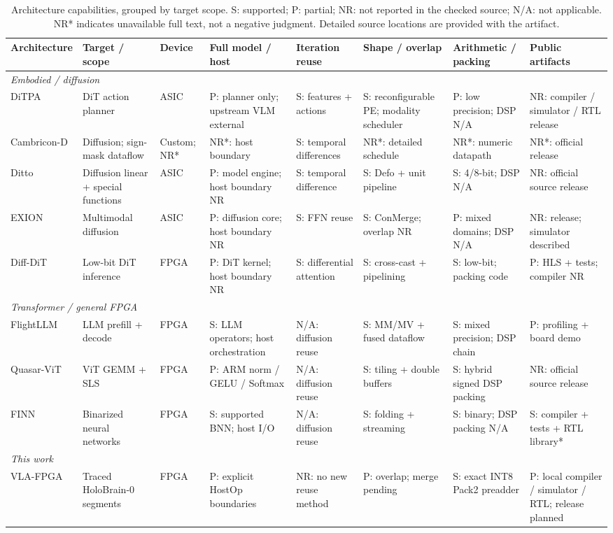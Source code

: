 \begin{table}[t]\centering
\caption{Architecture capabilities, grouped by target scope. S: supported; P: partial; NR: not reported in the checked source; N/A: not applicable. NR* indicates unavailable full text, not a negative judgment. Detailed source locations are provided with the artifact.}\label{tab:related}
\fontsize{7}{8.5}\selectfont\setlength{\tabcolsep}{2pt}\renewcommand{\arraystretch}{1.22}
\begin{tabularx}{\textwidth}{@{}p{}p{}p{}XXXX X@{}}\toprule
Architecture & Target / scope & Device & Full model / host & Iteration reuse & Shape / overlap & Arithmetic / packing & Public artifacts\\\midrule
\multicolumn{8}{l}{\textit{Embodied / diffusion}}\\
DiTPA~\cite{ditpa} & DiT action planner & ASIC & P: planner only; upstream VLM external & S: features + actions & S: reconfigurable PE; modality scheduler & P: low precision; DSP N/A & NR: compiler / simulator / RTL release\\
Cambricon-D~\cite{camd} & Diffusion; sign-mask dataflow & Custom; NR* & NR*: host boundary & S: temporal differences & NR*: detailed schedule & NR*: numeric datapath & NR*: official release\\
Ditto~\cite{ditto} & Diffusion linear + special functions & ASIC & P: model engine; host boundary NR & S: temporal difference & S: Defo + unit pipeline & S: 4/8-bit; DSP N/A & NR: official source release\\
EXION~\cite{exion} & Multimodal diffusion & ASIC & P: diffusion core; host boundary NR & S: FFN reuse & S: ConMerge; overlap NR & P: mixed domains; DSP N/A & NR: release; simulator described\\
Diff-DiT~\cite{diffdit} & Low-bit DiT inference & FPGA & P: DiT kernel; host boundary NR & S: differential attention & S: cross-cast + pipelining & S: low-bit; packing code & P: HLS + tests; compiler NR\\
\multicolumn{8}{l}{\textit{Transformer / general FPGA}}\\
FlightLLM~\cite{flight} & LLM prefill + decode & FPGA & S: LLM operators; host orchestration & N/A: diffusion reuse & S: MM/MV + fused dataflow & S: mixed precision; DSP chain & P: profiling + board demo\\
Quasar-ViT~\cite{quasar} & ViT GEMM + SLS & FPGA & P: ARM norm / GELU / Softmax & N/A: diffusion reuse & S: tiling + double buffers & S: hybrid signed DSP packing & NR: official source release\\
FINN~\cite{finn} & Binarized neural networks & FPGA & S: supported BNN; host I/O & N/A: diffusion reuse & S: folding + streaming & S: binary; DSP packing N/A & S: compiler + tests + RTL library*\\
\multicolumn{8}{l}{\textit{This work}}\\
VLA-FPGA & Traced HoloBrain-0 segments & FPGA & P: explicit HostOp boundaries & NR: no new reuse method & P: overlap; merge pending & S: exact INT8 Pack2 preadder & P: local compiler / simulator / RTL; release planned\\
\bottomrule\end{tabularx}\end{table}